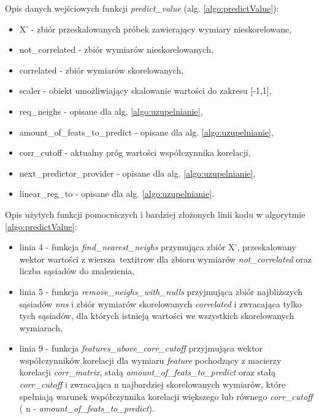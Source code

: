 \FloatBarrier
Opis danych wejściowych funkcji \textit{predict\_value} (alg. \ref{algo:predictValue}):
\begin{itemize}
    \item X' - zbiór przeskalowanych próbek zawierający wymiary nieskorelowane,
    \item not\_correlated - zbiór wymiarów nieskorelowanych,
    \item correlated - zbiór wymiarów skorelowanych,
    \item scaler - obiekt umożliwiający skalowanie wartości do zakresu [-1,1],
    \item req\_neighs - opisane dla alg. \ref{algo:uzupelnianie},
    \item amount\_of\_feats\_to\_predict - opisane dla alg. \ref{algo:uzupelnianie},
    \item corr\_cutoff - aktualny próg wartości współczynnika korelacji,
    \item next\_predictor\_provider - opisane dla alg. \ref{algo:uzupelnianie},
    \item linear\_reg\_to - opisane dla alg. \ref{algo:uzupelnianie}.
\end{itemize}

Opis użytych funkcji pomocniczych i bardziej złożonych linii kodu w algorytmie \ref{algo:predictValue}:
\begin{itemize}
    \item linia 4 - funkcja \textit{find\_nearest\_neighs} przymująca zbiór X', przeskalowany wektor wartości z wiersza\ textit{row} dla zbioru wymiarów \textit{not\_correlated} oraz liczba sąsiadów do znalezienia,
    \item linia 5 - funkcja \textit{remove\_neighs\_with\_nulls} przyjmująca zbiór najbliższych sąsiadów \textit{nns} i zbiór wymiarów skorelowanych \textit{correlated} i zwracająca tylko tych sąsiadów, dla których istnieją wartości we wszystkich skorelowanych wymiarach,
    \item linia 9 - funkcja \textit{features\_above\_corr\_cutoff} przyjmująca wektor współczynników korelacji dla wymiaru \textit{feature} pochodzący z macierzy korelacji \textit{corr\_matrix}, stałą \textit{amount\_of\_feats\_to\_predict} oraz stałą \textit{ corr\_cutoff} i zwracająca n najbardziej skorelowanych wymiarów, które spełniają warunek współczynnika korelacji większego lub równego \textit{corr\_cutoff} ( n - \textit{amount\_of\_feats\_to\_predict}).
\end{itemize}

